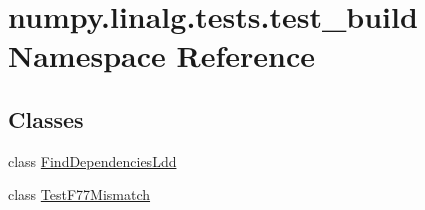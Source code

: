 \hypertarget{namespacenumpy_1_1linalg_1_1tests_1_1test__build}{}\section{numpy.\+linalg.\+tests.\+test\+\_\+build Namespace Reference}
\label{namespacenumpy_1_1linalg_1_1tests_1_1test__build}
\subsection*{Classes}
\begin{DoxyCompactItemize}
\item 
class \hyperlink{classnumpy_1_1linalg_1_1tests_1_1test__build_1_1FindDependenciesLdd}{Find\+Dependencies\+Ldd}
\item 
class \hyperlink{classnumpy_1_1linalg_1_1tests_1_1test__build_1_1TestF77Mismatch}{Test\+F77\+Mismatch}
\end{DoxyCompactItemize}
